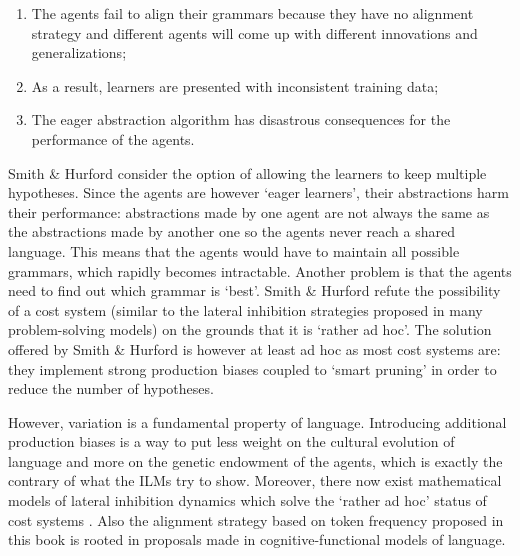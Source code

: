 \begin{enumerate}
\item The agents fail to align their grammars because they have no alignment strategy and different agents will come up with different innovations and generalizations;
\item As a result, learners are presented with inconsistent training data;
\item The eager abstraction algorithm has disastrous consequences for the performance of the agents.
\end{enumerate}

Smith \& Hurford consider the option of allowing the learners to keep multiple hypotheses. Since the agents are however `eager learners', their abstractions harm their performance: abstractions made by one agent are not always the same as the abstractions made by another one so the agents never reach a shared language. This means that the agents would have to maintain all possible grammars, which rapidly becomes intractable. Another problem is that the agents need to find out which grammar is `best'. Smith \& Hurford refute the possibility of a cost system (similar to the lateral inhibition strategies proposed in many problem-solving models) on the grounds that it is `rather ad hoc'. The solution offered by Smith \& Hurford is however at least ad hoc as most cost systems are: they implement strong production biases coupled to `smart pruning' in order to reduce the number of hypotheses.

However, variation is a fundamental property of language. Introducing  additional production biases is a way to put less weight on the cultural evolution of language and more on the genetic endowment of the agents, which is exactly the contrary of what the ILMs try to show. Moreover, there now exist mathematical models of lateral inhibition dynamics which solve the `rather ad hoc' status of cost systems \citep{baronchelli06sharp, devylder07evolution}. Also the alignment strategy based on token frequency proposed in this book is rooted in proposals made in cognitive-functional models of language.

